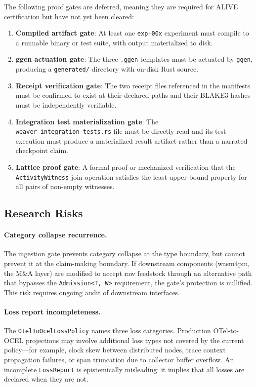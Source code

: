 The following proof gates are deferred, meaning they are required for ALIVE certification
but have not yet been cleared:

\begin{enumerate}
  \item \textbf{Compiled artifact gate}: At least one \texttt{exp-00x} experiment must
    compile to a runnable binary or test suite, with output materialized to disk.
  \item \textbf{ggen actuation gate}: The three \texttt{.ggen} templates must be actuated
    by \texttt{ggen}, producing a \texttt{generated/} directory with on-disk Rust source.
  \item \textbf{Receipt verification gate}: The two receipt files referenced in the manifests
    must be confirmed to exist at their declared paths and their BLAKE3 hashes must be
    independently verifiable.
  \item \textbf{Integration test materialization gate}: The
    \texttt{weaver\_integration\_tests.rs} file must be directly read and its test execution
    must produce a materialized result artifact rather than a narrated checkpoint claim.
  \item \textbf{Lattice proof gate}: A formal proof or mechanized verification that the
    \texttt{ActivityWitness} join operation satisfies the least-upper-bound property for
    all pairs of non-empty witnesses.
\end{enumerate}

\subsection{Research Risks}
\label{sec:otel-weaver-open-risks}

\paragraph{Category collapse recurrence.}
The ingestion gate prevents category collapse at the type boundary, but cannot prevent it at the
claim-making boundary. If downstream components (wasm4pm, the M\&A layer) are modified to accept
raw feedstock through an alternative path that bypasses the \texttt{Admission<T,\,W>} requirement,
the gate's protection is nullified. This risk requires ongoing audit of downstream interfaces.

\paragraph{Loss report incompleteness.}
The \texttt{OtelToOcelLossPolicy} names three loss categories. Production OTel-to-OCEL
projections may involve additional loss types not covered by the current policy---for example,
clock skew between distributed nodes, trace context propagation failures, or span truncation
due to collector buffer overflow. An incomplete \texttt{LossReport} is epistemically misleading:
it implies that all losses are declared when they are not.

